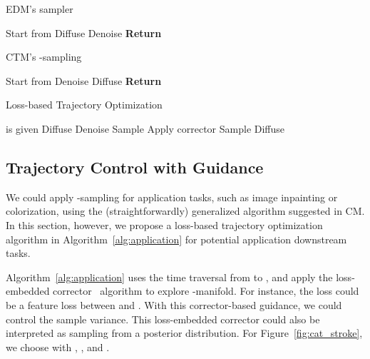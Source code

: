 \documentclass{article} \usepackage{iclr2024_coNFErence,times}
\theoremstyle{definition}
\theoremstyle{remark}
\begin{document}
\begin{minipage}{0.48\textwidth}
\begin{algorithm}[H]
    \centering
    \caption{EDM's sampler}\label{alg:EDM}
    \begin{algorithmic}[1]
    \State Start from 
        \State 
        \State Diffuse 
        \State Denoise 
        \EndFor
        \State \textbf{Return}  
    \end{algorithmic}
\end{algorithm}
\end{minipage}
\hfill
\begin{minipage}{0.48\textwidth}
\begin{algorithm}[H]
    \centering
    \caption{CTM's -sampling}\label{alg:gamma}
    \begin{algorithmic}[1]
    \State Start from 
        \State 
        \State Denoise 
        \State Diffuse 
        \EndFor
        \State \textbf{Return}  
    \end{algorithmic}
\end{algorithm}
\end{minipage}


\begin{algorithm}[H]
    \centering
    \caption{Loss-based Trajectory Optimization}\label{alg:application}
    \begin{algorithmic}[1]
    \State  is given
    \State Diffuse 
        \State 
        \State Denoise 
        \State Sample 
        \State Apply corrector 
        \EndFor
        \State Sample 
        \State Diffuse 
        \EndFor
    \end{algorithmic}
\end{algorithm}

\subsection{Trajectory Control with Guidance}\label{subsec:traj_control}


We could apply -sampling for application tasks, such as image inpainting or colorization, using the (straightforwardly) generalized algorithm suggested in CM. In this section, however, we propose a loss-based trajectory optimization algorithm in Algorithm~\ref{alg:application} for potential application downstream tasks.

Algorithm~\ref{alg:application} uses the time traversal from  to , and apply the loss-embedded corrector~\citep{song2020score} algorithm to explore -manifold. For instance, the loss could be a feature loss between  and . With this corrector-based guidance, we could control the sample variance. This loss-embedded corrector could also be interpreted as sampling from a posterior distribution. For Figure~\ref{fig:cat_stroke}, we choose  with , , and .
\end{document}
